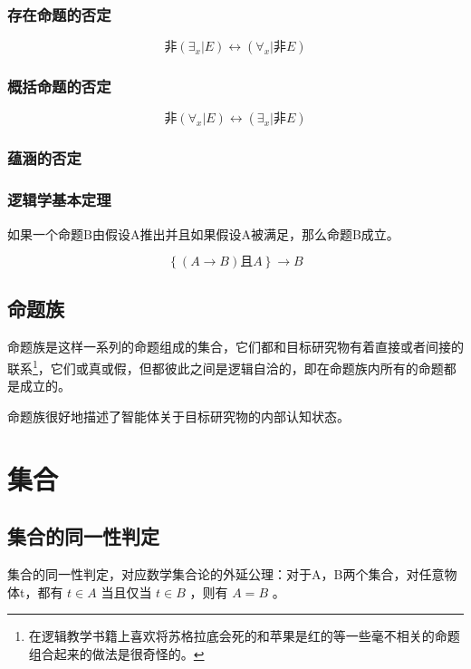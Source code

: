 \documentclass[12pt,oneside]{book}
\begin{document}
\subsubsection{存在命题的否定}
\begin{equation}
\text{非}(\exists_x | E) \leftrightarrow (\forall_x | \text{非}E)
\end{equation}

\subsubsection{概括命题的否定}
\begin{equation}
\text{非}(\forall_x | E) \leftrightarrow (\exists_x | \text{非}E)
\end{equation}

\subsubsection{蕴涵的否定}

\subsubsection{逻辑学基本定理}
如果一个命题B由假设A推出并且如果假设A被满足，那么命题B成立。

\begin{equation}
\left\{(A \rightarrow B) \text{且} A\right\} \rightarrow B
\end{equation}

\subsection{命题族}
命题族是这样一系列的命题组成的集合，它们都和目标研究物有着直接或者间接的联系\footnote{在逻辑教学书籍上喜欢将苏格拉底会死的和苹果是红的等一些毫不相关的命题组合起来的做法是很奇怪的。}，它们或真或假，但都彼此之间是逻辑自洽的，即在命题族内所有的命题都是成立的。

命题族很好地描述了智能体关于目标研究物的内部认知状态。




\section{集合}
\subsection{集合的同一性判定}
集合的同一性判定，对应数学集合论的外延公理：对于A，B两个集合，对任意物体t，都有 $t \in A$ 当且仅当 $t \in B$ ，则有 $A=B$ 。
\end{document}
